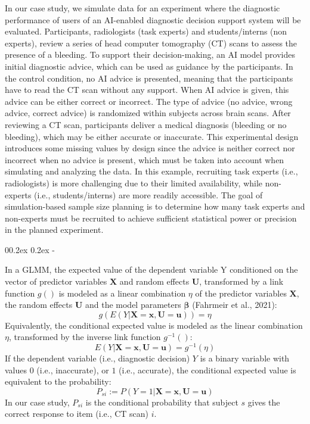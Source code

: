 \documentclass[
  man,floatsintext]{apa6}
\makeatletter
\let\oldsubparagraph\subparagraph
\renewcommand{\subparagraph}[1]{\oldsubparagraph{#1}\mbox{}}
\renewcommand{\subparagraph}[1]{\@startsection{subparagraph}{5}{1em}%
  {0\baselineskip \@plus 0.2ex \@minus 0.2ex}%
  {-\z@\relax}%
  {\normalfont\normalsize\itshape\hspace{\parindent}{#1}\textit{\addperi}}{\relax}}
\makeatother
\begin{document}
In our case study, we simulate data for an experiment where the diagnostic performance of users of an AI-enabled diagnostic decision support system will be evaluated.
Participants, radiologists (task experts) and students/interns (non experts), review a series of head computer tomography (CT) scans to assess the presence of a bleeding.
To support their decision-making, an AI model provides initial diagnostic advice, which can be used as guidance by the participants.
In the control condition, no AI advice is presented, meaning that the participants have to read the CT scan without any support.
When AI advice is given, this advice can be either correct or incorrect.
The type of advice (no advice, wrong advice, correct advice) is randomized within subjects across brain scans.
After reviewing a CT scan, participants deliver a medical diagnosis (bleeding or no bleeding), which may be either accurate or inaccurate.
This experimental design introduces some missing values by design since the advice is neither correct nor incorrect when no advice is present, which must be taken into account when simulating and analyzing the data.
In this example, recruiting task experts (i.e., radiologists) is more challenging due to their limited availability, while non-experts (i.e., students/interns) are more readily accessible.
The goal of simulation-based sample size planning is to determine how many task experts and non-experts must be recruited to achieve sufficient statistical power or precision in the planned experiment.

\hypertarget{our-specific-glmm}{%
\subparagraph{Our specific GLMM}\label{our-specific-glmm}}

In a GLMM, the expected value of the dependent variable Y conditioned on the vector of predictor variables \(\mathbf{X}\) and random effects \(\mathbf{U}\), transformed by a link function \(g()\) is modeled as a linear combination \(\eta\) of the predictor variables \(\mathbf{X}\), the random effects \(\mathbf{U}\) and the model parameters \(\mathbf{\beta}\) (Fahrmeir et al., 2021):
\[
g(E(Y|\mathbf{X}=\mathbf{x},\mathbf{U}=\mathbf{u})) = \eta
\]
Equivalently, the conditional expected value is modeled as the linear combination \(\eta\), transformed by the inverse link function \(g^{-1}()\):
\[
E(Y|\mathbf{X}=\mathbf{x},\mathbf{U}=\mathbf{u}) = g^{-1}(\eta)
\]
If the dependent variable (i.e., diagnostic decision) \(Y\) is a binary variable with values \(0\) (i.e., inaccurate), or \(1\) (i.e., accurate), the conditional expected value is equivalent to the probability:
\[
P_{si} := P(Y = 1|\mathbf{X}=\mathbf{x},\mathbf{U}=\mathbf{u})
\]
In our case study, \(P_{si}\) is the conditional probability that subject \(s\) gives the correct response to item (i.e., CT scan) \(i\).
\end{document}
